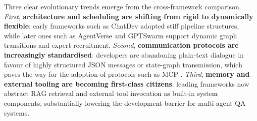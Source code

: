 Three clear evolutionary trends emerge from the cross-framework comparison.
\emph{First}, \textbf{architecture and scheduling are shifting from rigid
to dynamically flexible}: early frameworks such as ChatDev adopted stiff
pipeline structures, while later ones such as AgentVerse and GPTSwarm
support dynamic graph transitions and expert recruitment.
\emph{Second}, \textbf{communication protocols are increasingly
standardised}: developers are abandoning plain-text dialogue in favour of
highly structured JSON messages or state-graph transmission, which paves
the way for the adoption of protocols such as MCP
\citep{anthropic2024mcp}.
\emph{Third}, \textbf{memory and external tooling are becoming
first-class citizens}: leading frameworks now abstract RAG retrieval and
external tool invocation as built-in system components, substantially
lowering the development barrier for multi-agent QA systems.
